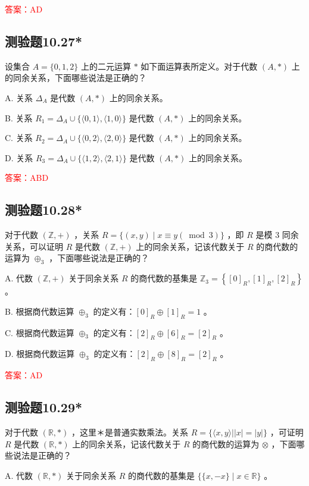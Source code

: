 \documentclass[UTF8, heading=true]{ctexart}
\begin{document}
\textcolor{red}{答案：AD}

\subsection{测验题10.27*}

设集合 $A=\{0,1,2\}$ 上的二元运算 $*$ 如下面运算表所定义。对于代数 $(A, *)$ 上的同余关系，下面哪些说法是正确的？

A. 关系 $\Delta_A$ 是代数 $(A, *)$ 上的同余关系。

B. 关系 $R_1=\Delta_A \cup\{\langle 0,1\rangle,\langle 1,0\rangle\}$ 是代数 $(A, *)$ 上的同余关系。

C. 关系 $R_2=\Delta_A \cup\{\langle 0,2\rangle,\langle 2,0\rangle\}$ 是代数 $(A, *)$ 上的同余关系。

D. 关系 $R_3=\Delta_A \cup\{\langle 1,2\rangle,\langle 2,1\rangle\}$ 是代数 $(A, *)$ 上的同余关系。

\textcolor{red}{答案：ABD}

\subsection{测验题10.28*}

对于代数 $(\mathbb{Z},+)$ ，关系 $R=\{(x, y) \mid x \equiv y(\bmod 3)\}$ ，即 $R$ 是模 3 同余关系，可以证明 $R$ 是代数 $(\mathbb{Z},+)$ 上的同余关系，记该代数关于 $R$ 的商代数的运算为 $\oplus_3$ ，下面哪些说法是正确的？

A. 代数 $(\mathbb{Z},+)$ 关于同余关系 $R$ 的商代数的基集是 $\mathbb{Z}_3=\left\{[0]_R,[1]_R,[2]_R\right\}$ 。

B. 根据商代数运算 $\oplus_3$ 的定义有：$[0]_R \oplus[1]_R=1$ 。

C. 根据商代数运算 $\oplus_3$ 的定义有：$[2]_R \oplus[6]_R=[2]_R$ 。

D. 根据商代数运算 $\oplus_3$ 的定义有：$[2]_R \oplus[8]_R=[2]_R$ 。

\textcolor{red}{答案：AD}

\subsection{测验题10.29*}

对于代数 $(\mathbb{R}, *)$ ，这里＊是普通实数乘法。关系 $R=\{\langle x, y\rangle| | x|=|y|\}$ ，可证明 $R$ 是代数 $(\mathbb{R}, *)$ 上的同余关系，记该代数关于 $R$ 的商代数的运算为 $\otimes$ ，下面哪些说法是正确的？

A. 代数 $(\mathbb{R}, *)$ 关于同余关系 $R$ 的商代数的基集是 $\{\{x,-x\} \mid x \in \mathbb{R}\}$ 。
\end{document}
